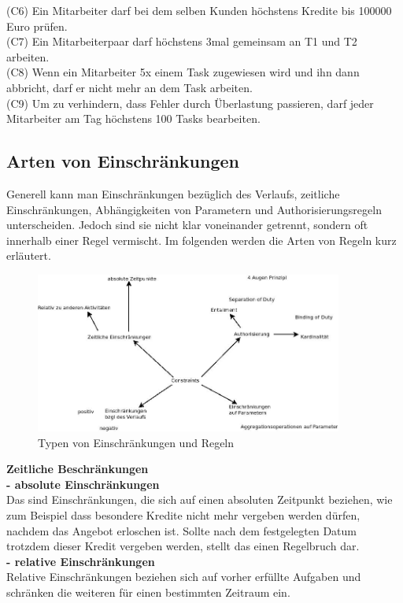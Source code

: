 (C6) Ein Mitarbeiter darf bei dem selben Kunden höchstens Kredite bis 100000 Euro prüfen.\\
(C7) Ein Mitarbeiterpaar darf höchstens 3mal gemeinsam an T1 und T2 arbeiten.\\

(C8) Wenn ein Mitarbeiter 5x einem Task zugewiesen wird und ihn dann abbricht, darf er nicht mehr an dem Task arbeiten.\\
(C9) Um zu verhindern, dass Fehler durch Überlastung passieren, darf jeder Mitarbeiter am Tag höchstens 100 Tasks bearbeiten.\\

%
%
\subsection{Arten von Einschränkungen}
\label{sec:ArtenConstraints}

Generell kann man Einschränkungen bezüglich des Verlaufs, zeitliche Einschränkungen, Abhängigkeiten von Parametern und Authorisierungsregeln unterscheiden. Jedoch sind sie nicht klar voneinander getrennt, sondern oft innerhalb einer Regel vermischt. Im folgenden werden die Arten von Regeln kurz erläutert.\\

\begin{figure}[ht]
	\centering
  \includegraphics[width=0.9\textwidth]{Figures/Constraints}
	\caption{Typen von Einschränkungen und Regeln}
	\label{fig:constraints}
\end{figure}

\textbf{Zeitliche Beschränkungen}\\
\textbf{- absolute Einschränkungen}\\
Das sind Einschränkungen, die sich auf einen absoluten Zeitpunkt beziehen, wie zum Beispiel dass besondere Kredite nicht mehr vergeben werden dürfen, nachdem das Angebot erloschen ist. Sollte nach dem festgelegten Datum trotzdem dieser Kredit vergeben werden, stellt das einen Regelbruch dar.\\
\textbf{- relative Einschränkungen}\\
Relative Einschränkungen beziehen sich auf vorher erfüllte Aufgaben und schränken die weiteren für einen bestimmten Zeitraum ein.\\

